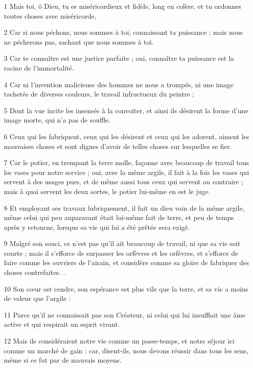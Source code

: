 
\par 1 Mais toi, ô Dieu, tu es miséricordieux et fidèle, long en colère, et tu ordonnes toutes choses avec miséricorde,
\par 2 Car si nous péchons, nous sommes à toi, connaissant ta puissance ; mais nous ne pécherons pas, sachant que nous sommes à toi.
\par 3 Car te connaître est une justice parfaite ; oui, connaître ta puissance est la racine de l'immortalité.
\par 4 Car ni l'invention malicieuse des hommes ne nous a trompés, ni une image tachetée de diverses couleurs, le travail infructueux du peintre ;
\par 5 Dont la vue incite les insensés à la convoiter, et ainsi ils désirent la forme d'une image morte, qui n'a pas de souffle.
\par 6 Ceux qui les fabriquent, ceux qui les désirent et ceux qui les adorent, aiment les mauvaises choses et sont dignes d'avoir de telles choses sur lesquelles se fier.
\par 7 Car le potier, en trempant la terre molle, façonne avec beaucoup de travail tous les vases pour notre service ; oui, avec la même argile, il fait à la fois les vases qui servent à des usages purs, et de même aussi tous ceux qui servent au contraire ; mais à quoi servent les deux sortes, le potier lui-même en est le juge.
\par 8 Et employant ses travaux lubriquement, il fait un dieu vain de la même argile, même celui qui peu auparavant était lui-même fait de terre, et peu de temps après y retourne, lorsque sa vie qui lui a été prêtée sera exigé.
\par 9 Malgré son souci, ce n'est pas qu'il ait beaucoup de travail, ni que sa vie soit courte ; mais il s'efforce de surpasser les orfèvres et les orfèvres, et s'efforce de faire comme les ouvriers de l'airain, et considère comme sa gloire de fabriquer des choses contrefaites. .
\par 10 Son cœur est cendre, son espérance est plus vile que la terre, et sa vie a moins de valeur que l'argile :
\par 11 Parce qu'il ne connaissait pas son Créateur, ni celui qui lui insufflait une âme active et qui respirait un esprit vivant.
\par 12 Mais ils considéraient notre vie comme un passe-temps, et notre séjour ici comme un marché de gain : car, disent-ils, nous devons réussir dans tous les sens, même si ce fut par de mauvais moyens.

